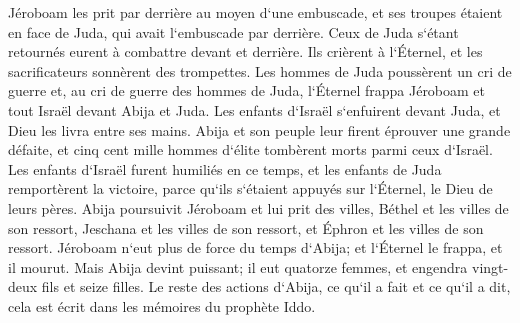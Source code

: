 \verse Jéroboam les prit par derrière au moyen d`une embuscade, et ses troupes étaient en face de Juda, qui avait l`embuscade par derrière. 
\verse Ceux de Juda s`étant retournés eurent à combattre devant et derrière. Ils crièrent à l`Éternel, et les sacrificateurs sonnèrent des trompettes. 
\verse Les hommes de Juda poussèrent un cri de guerre et, au cri de guerre des hommes de Juda, l`Éternel frappa Jéroboam et tout Israël devant Abija et Juda. 
\verse Les enfants d`Israël s`enfuirent devant Juda, et Dieu les livra entre ses mains. 
\verse Abija et son peuple leur firent éprouver une grande défaite, et cinq cent mille hommes d`élite tombèrent morts parmi ceux d`Israël. 
\verse Les enfants d`Israël furent humiliés en ce temps, et les enfants de Juda remportèrent la victoire, parce qu`ils s`étaient appuyés sur l`Éternel, le Dieu de leurs pères. 
\verse Abija poursuivit Jéroboam et lui prit des villes, Béthel et les villes de son ressort, Jeschana et les villes de son ressort, et Éphron et les villes de son ressort. 
\verse Jéroboam n`eut plus de force du temps d`Abija; et l`Éternel le frappa, et il mourut. 
\verse Mais Abija devint puissant; il eut quatorze femmes, et engendra vingt-deux fils et seize filles. 
\verse Le reste des actions d`Abija, ce qu`il a fait et ce qu`il a dit, cela est écrit dans les mémoires du prophète Iddo. 

\chapter{}

